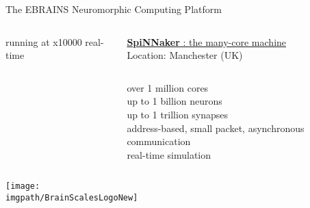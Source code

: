 \begin{myblock1}{\Large The EBRAINS Neuromorphic Computing Platform \phantom{\Huge $\beta$}}
\begin{columns}[t]
\begin{column}{0.46\textwidth}
\begin{columns}[c]
\begin{column}{0.50\textwidth}
\begin{flushright}
{                            running at x10000 real-time
                        }
                    \end{flushright}
                \end{column}
            \end{columns}
        \end{column}

        \begin{column}{0.46\textwidth}
            \begin{flushleft}
                \underline{\textbf{SpiNNaker} : the many-core machine}\\[1mm]
                \scriptsize{Location: Manchester (UK)}
            \end{flushleft}
            \vskip-9mm
            \begin{columns}[c]
                \begin{column}{0.40\textwidth}
                    \begin{flushleft}
                        \small{
                            over 1 million cores\\[2mm]

                            up to 1 billion neurons \\
                            up to 1 trillion synapses\\[2mm]

                            address-based, small packet, asynchronous communication\\[2mm]

                            real-time simulation
                        }
                    \end{flushleft}
                \end{column}
            \end{columns}
        \end{column}
    \end{columns}
    \vskip-15mm
    \begin{columns}[t]
        \begin{column}{0.46\textwidth}
            \hspace{55mm} \texttt{[image: \\imgpath/BrainScalesLogoNew]}
        \end{column}


\end{columns}
\end{myblock1}
